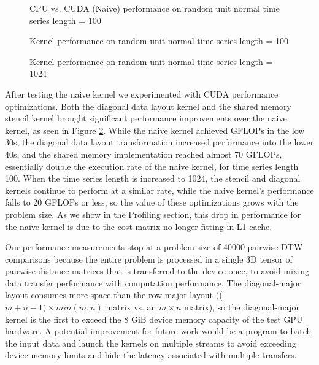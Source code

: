 \documentclass[12pt, letterpaper]{article}
\begin{document}
\begin{figure}[htbp]
    \begin{center}
        \scalebox{0.85}{}
    \end{center}
    \caption{CPU vs. CUDA (Naive) performance on random unit normal time series
      length = 100}
    \label{plot_cpu_gpu}
\end{figure}


\begin{figure}[htbp]
    \begin{center}
        \scalebox{0.85}{}
    \end{center}
    \caption{Kernel performance on random unit normal time series length =
      100}
    \label{plot_multi}
\end{figure}

\begin{figure}[htbp]
    \begin{center}
        \scalebox{0.85}{}
    \end{center}
    \caption{Kernel performance on random unit normal time series length =
      1024}
    \label{plot_multi_1024}
\end{figure}


After testing the naive kernel we experimented with CUDA performance
optimizations. Both the diagonal data layout kernel and the shared memory
stencil kernel brought significant performance improvements over the naive
kernel, as seen in Figure \ref{plot_multi}. While the naive kernel achieved
GFLOPs in the low 30s, the diagonal data layout transformation increased
performance into the lower 40s, and the shared memory implementation reached
almost 70 GFLOPs, essentially double the execution rate of the naive kernel, for
time series length 100. When the time series length is increased to 1024, the
stencil and diagonal kernels continue to perform at a similar rate, while the
naive kernel's performance falls to 20 GFLOPs or less, so the value of these
optimizations grows with the problem size. As we show in the Profiling section,
this drop in performance for the naive kernel is due to the cost matrix no
longer fitting in L1 cache.

Our performance measurements stop at a problem size of 40000 pairwise DTW
comparisons because the entire problem is processed in a single 3D tensor of
pairwise distance matrices that is transferred to the device once, to avoid
mixing data transfer performance with computation performance. The
diagonal-major layout consumes more space than the row-major layout (($m+n-1) \times
min(m,n)$ matrix vs. an $m \times n$ matrix), so the diagonal-major kernel is the
first to exceed the 8 GiB device memory capacity of the test GPU hardware. A
potential improvement for future work would be a program to batch the input data
and launch the kernels on multiple streams to avoid exceeding device memory
limits and hide the latency associated with multiple transfers.
\end{document}
